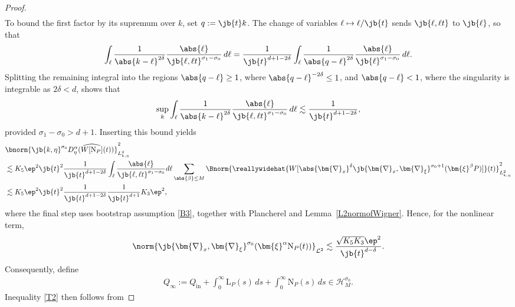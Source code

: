 \begin{proof}
\begin{multline*}
\end{multline*}
To bound the first factor by its supremum over $k$, set $q:=\jb{t}k$. The change of variables $\ell\mapsto\ell/\jb{t}$ sends $\jb{\ell,\ell t}$ to $\jb{\ell}$, so that
\begin{align}\label{beforebound}
\int_\ell \frac{1}{\abs{k-\ell }^{2\delta}}\frac{\abs{\ell }}{\jb{\ell ,\ell t}^{\sigma_1-\sigma_0}}\,d\ell=\frac{1}{\jb{t}^{d+1-2\delta}}\int_\ell \frac{1}{\abs{q-\ell}^{2\delta}}\frac{\abs{\ell }}{\jb{\ell}^{\sigma_1-\sigma_0}}\,d\ell.
\end{align}
Splitting the remaining integral into the regions $\abs{q-\ell}\geq1$, where $\abs{q-\ell}^{-2\delta}\leq1$, and $\abs{q-\ell}<1$, where the singularity is integrable as $2\delta<d$, shows that
\begin{align*}
\sup_{k}\int_\ell \frac{1}{\abs{k-\ell }^{2\delta}}\frac{\abs{\ell }}{\jb{\ell ,\ell t}^{\sigma_1-\sigma_0}}\,d\ell\lesssim\frac{1}{\jb{t}^{d+1-2\delta}},
\end{align*}provided $\sigma_1-\sigma_0>d+1$.
Inserting this bound yields
\begin{align*}
&\bnorm{\jb{k,\eta}^{\sigma_0}D^\alpha_\eta(\widehat {W[{\mathrm{N}_P}]}(t))}^2_{L^2_{k,\eta}}\\
&\lesssim K_5\ep^2\jb{t}^2\frac{1}{\jb{t}^{d+1-2\delta}}\int_\ell \frac{\abs{\ell }}{\jb{\ell ,\ell t}^{\sigma_1-\sigma_0}}d\ell\sum_{\abs{\beta}\leq {M}}\Bnorm{\reallywidehat{W[\abs{\bm{\nabla}_x}^\delta\jb{\bm{\nabla}_x,\bm{\nabla}_\xi}^{\sigma_0+1}(\bm{\xi}^\beta P)]}(t)}^2_{L^2_{k,\eta}}\\
&\lesssim K_5\ep^2\jb{t}^2\frac{1}{\jb{t}^{d+1-2\delta}}\frac{1}{\jb{t}^{d+1}}K_3\ep^2,
\end{align*}where the final step uses bootstrap assumption \eqref{B3}, together with Plancherel and Lemma~\ref{L2normofWigner}. Hence, for the nonlinear term,\vspace*{-3pt}
\begin{align*}
\norm{\jb{\bm{\nabla}_x,\bm{\nabla}_{\xi}}^{\sigma_0}(\bm{\xi}^\alpha {\mathrm{N}_P}(t))}_{\mathcal L^2}\lesssim\frac{\sqrt{K_5K_3}\ep^2}{\jb{t}^{d-\delta}}.
\end{align*}
Consequently, define\vspace*{-3pt}
\begin{align*}
Q_\infty:=Q_{\mathrm{in}}+\int_0^\infty \mathrm{L}_P(s)\,ds+\int_0^\infty \mathrm{N}_P(s)\,ds\in \mathcal H^{\sigma_0}_M.
\end{align*}
Inequality \eqref{T2} then follows from\vspace*{-3pt}

\end{proof}
